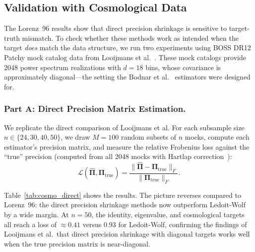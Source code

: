 \subsection{Validation with Cosmological Data}
\label{sec:cosmo_validation}

The Lorenz~96 results show that direct precision shrinkage is sensitive to target-truth mismatch. To check whether these methods work as intended when the target \emph{does} match the data structure, we run two experiments using BOSS DR12 Patchy mock catalog data from Looijmans et al.~\cite{looijmans2024comparison}. These mock catalogs provide 2048 power spectrum realizations with $d = 18$ bins, whose covariance is approximately diagonal---the setting the Bodnar et al.~\cite{bodnar2016direct} estimators were designed for.

\subsubsection{Part A: Direct Precision Matrix Estimation.}
\label{sec:cosmo_direct}

We replicate the direct comparison of Looijmans et al. For each subsample size $n \in \{24, 30, 40, 50\}$, we draw $M = 100$ random subsets of $n$ mocks, compute each estimator's precision matrix, and measure the relative Frobenius loss against the ``true'' precision (computed from all 2048 mocks with Hartlap correction~\cite{hartlap2007your}):
\begin{equation}
\label{eq:matrix_loss}
\mathcal{L}(\hat{\boldsymbol{\Pi}}, \boldsymbol{\Pi}_{\text{true}}) = \frac{\|\hat{\boldsymbol{\Pi}} - \boldsymbol{\Pi}_{\text{true}}\|_F}{\|\boldsymbol{\Pi}_{\text{true}}\|_F}.
\end{equation}

Table~\ref{tab:cosmo_direct} shows the results. The picture reverses compared to Lorenz~96: the direct precision shrinkage methods now outperform Ledoit-Wolf by a wide margin. At $n = 50$, the identity, eigenvalue, and cosmological targets all reach a loss of $\approx 0.41$ versus $0.93$ for Ledoit-Wolf, confirming the findings of Looijmans et al.\ that direct precision shrinkage with diagonal targets works well when the true precision matrix is near-diagonal.

